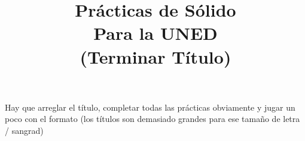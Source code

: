 \documentclass[a4paper,12pt,spanish]{report}
\begin{document}
	
	
	\title{Prácticas de Sólido\\Para la UNED\\ \Large{(Terminar Título)} }
	
	\date{}
	
	\maketitle
	
	\tableofcontents
	
	
	
	\vspace{6\baselineskip}
	Hay que arreglar el título, completar todas las prácticas obviamente y jugar un poco con el formato (los títulos son demasiado grandes para ese tamaño de letra / sangrad)
	
	

	
	
	
	
	
	
	
	
	
	
	
	
\end{document}
